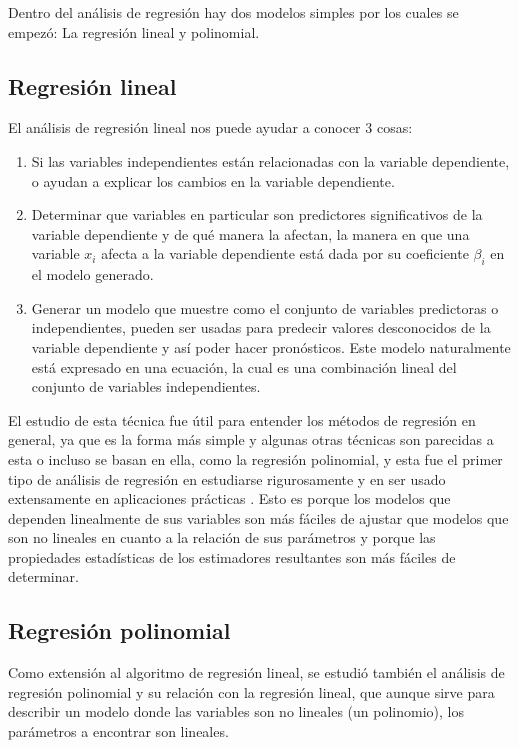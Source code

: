 Dentro del análisis de regresión hay dos modelos simples por los cuales se
empezó: La regresión lineal y polinomial.

\subsection{Regresión lineal}
El análisis de regresión lineal nos puede ayudar a conocer 3 cosas:

\begin{enumerate}
	\item Si las variables independientes están relacionadas con la variable dependiente, o ayudan a explicar los cambios en la variable dependiente.
	\item Determinar que variables en particular son predictores significativos de la variable dependiente y de qué manera la afectan, la manera en que una variable $x_i$ afecta a la variable dependiente está dada por su coeficiente $\beta_i$ en el modelo generado.
	\item Generar un modelo que muestre como el conjunto de variables predictoras o independientes, pueden ser usadas para predecir valores desconocidos de la variable dependiente y así poder hacer pronósticos. Este modelo naturalmente está expresado en una ecuación, la cual es una combinación lineal del conjunto de variables independientes.
\end{enumerate}

El estudio de esta técnica fue útil para entender los métodos de regresión en general, ya que es la forma más simple y algunas otras técnicas son parecidas a esta o incluso se basan en ella, como la regresión polinomial, y esta fue el primer tipo de análisis de regresión en estudiarse rigurosamente y en ser usado extensamente en aplicaciones prácticas \cite{XYanLinearRegressionAnalysis}.
Esto es porque los modelos que dependen linealmente de sus variables son más fáciles de ajustar que modelos que son no lineales en cuanto a la relación de sus parámetros y porque las propiedades estadísticas de los estimadores resultantes son más fáciles de determinar.

\subsection{Regresión polinomial}\label{subsec:regresionPolinomial}
Como extensión al algoritmo de regresión lineal, se estudió también el análisis de regresión polinomial y su relación con la regresión lineal, que aunque sirve para describir un modelo donde las variables son no lineales (un polinomio), los parámetros a encontrar son lineales.

